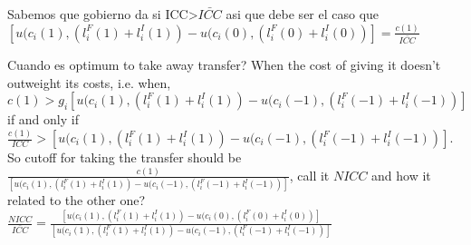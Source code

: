 \documentclass[12pt]{article}
\begin{document}
Sabemos que gobierno da si ICC>$\bar{ICC}$ asi que debe ser el caso que $[u(c_i(1),(l^F_i(1)+l^I_i(1))-u(c_i(0),(l^F_i(0)+l^I_i(0))]=\frac{c(1)}{\bar{ICC}}$

Cuando es optimum to take away transfer? When the cost of giving it doesn't outweight its costs, i.e. when, $c(1)>g_i[u(c_i(1),(l^F_i(1)+l^I_i(1))-u(c_i(-1),(l^F_i(-1)+l^I_i(-1))]$ if and only if $\frac{c(1)}{ICC}>[u(c_i(1),(l^F_i(1)+l^I_i(1))-u(c_i(-1),(l^F_i(-1)+l^I_i(-1))]$. So cutoff for taking the transfer should be $\frac{c(1)}{[u(c_i(1),(l^F_i(1)+l^I_i(1))-u(c_i(-1),(l^F_i(-1)+l^I_i(-1))]}$, call it $NICC$ and how it related to the other one? $\frac{NICC}{\bar{ICC}} = \frac{[u(c_i(1),(l^F_i(1)+l^I_i(1))-u(c_i(0),(l^F_i(0)+l^I_i(0))]}{[u(c_i(1),(l^F_i(1)+l^I_i(1))-u(c_i(-1),(l^F_i(-1)+l^I_i(-1))]}$




\end{document}

